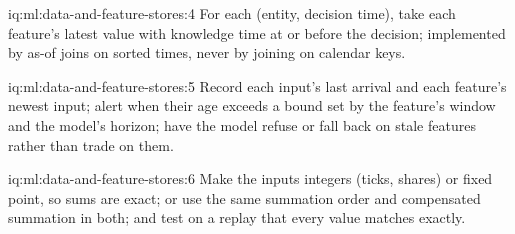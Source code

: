 \begin{solution}{iq:ml:data-and-feature-stores:4}
For each (entity, decision time), take each feature's latest value with knowledge time at or before the decision; implemented
by as-of joins on sorted times, never by joining on calendar keys.
\end{solution}

\begin{solution}{iq:ml:data-and-feature-stores:5}
Record each input's last arrival and each feature's newest input; alert when their age exceeds a bound set by the feature's
window and the model's horizon; have the model refuse or fall back on stale features rather than trade on them.
\end{solution}

\begin{solution}{iq:ml:data-and-feature-stores:6}
Make the inputs integers (ticks, shares) or fixed point, so sums are exact; or use the same summation order and compensated
summation in both; and test on a replay that every value matches exactly.
\end{solution}
